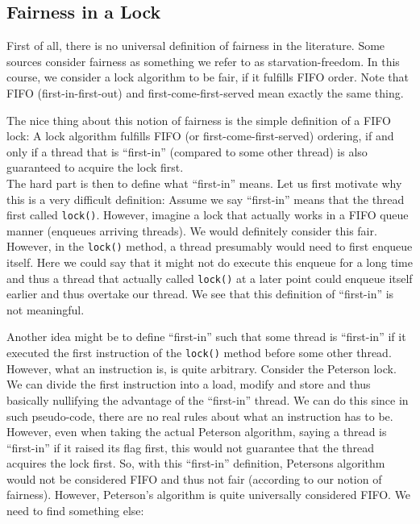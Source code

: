 \documentclass{article}
\begin{document}
    \subsection{Fairness in a Lock}
    First of all, there is no universal definition of fairness in the literature. Some sources consider fairness as something we refer to as starvation-freedom. In this course, we consider a lock algorithm to be fair, if it fulfills FIFO order. Note that FIFO (first-in-first-out) and first-come-first-served mean exactly the same thing.

    The nice thing about this notion of fairness is the simple definition of a FIFO lock: A lock algorithm fulfills FIFO (or first-come-first-served) ordering, if and only if a thread that is ``first-in'' (compared to some other thread) is also guaranteed to acquire the lock first.\\
    The hard part is then to define what ``first-in'' means. Let us first motivate why this is a very difficult definition: Assume we say ``first-in'' means that the thread first called \texttt{lock()}. However, imagine a lock that actually works in a FIFO queue manner (enqueues arriving threads). We would definitely consider this fair. However, in the \texttt{lock()} method, a thread presumably would need to first enqueue itself. Here we could say that it might not do execute this enqueue for a long time and thus a thread that actually called \texttt{lock()} at a later point could enqueue itself earlier and thus overtake our thread. We see that this definition of ``first-in'' is not meaningful.

    Another idea might be to define ``first-in'' such that some thread is ``first-in'' if it executed the first instruction of the \texttt{lock()} method before some other thread. However, what an instruction is, is quite arbitrary. Consider the Peterson lock. We can divide the first instruction into a load, modify and store and thus basically nullifying the advantage of the ``first-in'' thread. We can do this since in such pseudo-code, there are no real rules about what an instruction has to be. However, even when taking the actual Peterson algorithm, saying a thread is ``first-in'' if it raised its flag first, this would not guarantee that the thread acquires the lock first. So, with this ``first-in'' definition, Petersons algorithm would not be considered FIFO and thus not fair (according to our notion of fairness). However, Peterson's algorithm is quite universally considered FIFO. We need to find something else:
\end{document}
